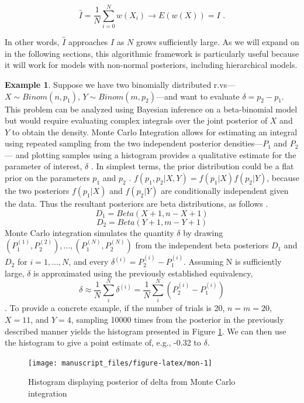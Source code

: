\documentclass[
  12pt,
  twoside]{book}
\theoremstyle{definition}
\theoremstyle{definition}
\newtheorem{example}{Example}[chapter]
\theoremstyle{definition}
\theoremstyle{remark}
\begin{document}
\[\hat{I}=\frac{1}{N}\sum_{i=0}^{N}w(X_{i})\rightarrow E(w(X))=I \textrm{ .}\]

In other words, \(\hat{I}\) approaches \(I\) as \(N\) grows sufficiently large.
As we will expand on in the following sections, this algorithmic framework is particularly useful because it will work for models with non-normal posteriors, including hierarchical models.

\begin{example}
\protect\hypertarget{exm:montecarl}{}{\label{exm:montecarl} }Suppose we have two binomially distributed r.vs---\(X \sim Binom(n,p_1)\), \(Y \sim Binom(m,p_2)\)---and want to evaluate \(\delta = p_2 - p_1\).
This problem can be analyzed using Bayesian inference on a beta-binomial model but would require evaluating complex integrals over the joint posterior of \(X\) and \(Y\) to obtain the density.
Monte Carlo Integration allows for estimating an integral using repeated sampling from the two independent posterior densities---\(P_1\) and \(P_2\)--- and plotting samples using a histogram provides a qualitative estimate for the parameter of interest, \(\delta\) \citep[  24.2]{Wasserman2004}.
In simplest terms, the prior distribution could be a flat prior on the parameters \(p_1\) and \(p_2\) \citep[  24.2, \citet{Bloom2014}]{Wasserman2004}.
\(f(p_1,p_2|X,Y)=f(p_1|X)f(p_2|Y)\), because the two posteriors \(f(p_1|X)\) and \(f(p_2|Y)\) are conditionally independent given the data.
Thus the resultant posteriors are beta distributions, as follows \citep{Bloom2014}.
\[D_1 = Beta(X+1,n-X+1)\]
\[D_2 = Beta(Y+1,m-Y+1)\]
Monte Carlo integration simulates the quantity \(\delta\) by drawing \((P_1^{(1)},P_2^{(2)}),...,(P_1^{(N)},P_2^{(N)})\) from the independent beta posteriors \(D_1\) and \(D_2\) for \(i=1,...,N\), and every \(\delta^{(i)}=P_2^{(i)} - P_1^{(i)}\).
Assuming N is sufficiently large, \(\delta\) is approximated using the previously established equivalency, \[\delta \approx \frac{1}{N} \sum_i^N \delta^{(i)} = \frac{1}{N} \sum_i^N (P_2^{(i)} - P_1^{(i)})\] \citep[  24.2]{Wasserman2004}.
To provide a concrete example, if the number of trials is 20, \(n=m=20\), \(X = 11\), and \(Y = 4\), sampling 10000 times from the posterior in the previously described manner yields the histogram presented in Figure \ref{fig:mon}.
We can then use the histogram to give a point estimate of, e.g., -0.32 to \(\delta\).
\end{example}

\begin{figure}

{\centering \texttt{[image: manuscript\_files/figure-latex/mon-1]} 

}

\caption{Histogram displaying posterior of delta from Monte Carlo integration}\label{fig:mon}
\end{figure}
\end{document}
